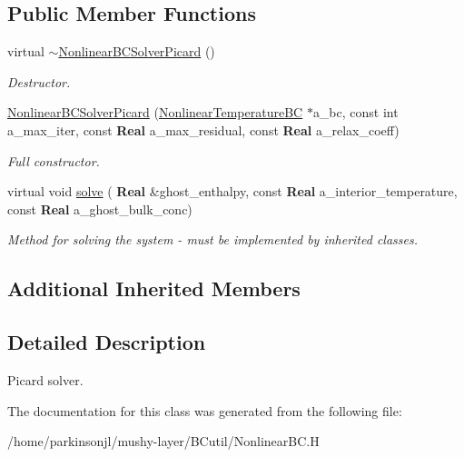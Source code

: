 \subsection*{Public Member Functions}
\begin{DoxyCompactItemize}
\item 
\mbox{\label{class_nonlinear_b_c_solver_picard_aadd7fd7236e3bd17e9ecbe98732fbaef}} 
virtual \hyperlink{class_nonlinear_b_c_solver_picard_aadd7fd7236e3bd17e9ecbe98732fbaef}{$\sim$\+Nonlinear\+B\+C\+Solver\+Picard} ()
\begin{DoxyCompactList}\small\item\em Destructor. \end{DoxyCompactList}\item 
\mbox{\label{class_nonlinear_b_c_solver_picard_a637dbc8d01d0325d8faf047ad6730ed8}} 
\hyperlink{class_nonlinear_b_c_solver_picard_a637dbc8d01d0325d8faf047ad6730ed8}{Nonlinear\+B\+C\+Solver\+Picard} (\hyperlink{class_nonlinear_temperature_b_c}{Nonlinear\+Temperature\+BC} $\ast$a\+\_\+bc, const int a\+\_\+max\+\_\+iter, const \textbf{ Real} a\+\_\+max\+\_\+residual, const \textbf{ Real} a\+\_\+relax\+\_\+coeff)
\begin{DoxyCompactList}\small\item\em Full constructor. \end{DoxyCompactList}\item 
\mbox{\label{class_nonlinear_b_c_solver_picard_aae46d9aa4e8770ba02b10111ecca6a6f}} 
virtual void \hyperlink{class_nonlinear_b_c_solver_picard_aae46d9aa4e8770ba02b10111ecca6a6f}{solve} (\textbf{ Real} \&ghost\+\_\+enthalpy, const \textbf{ Real} a\+\_\+interior\+\_\+temperature, const \textbf{ Real} a\+\_\+ghost\+\_\+bulk\+\_\+conc)
\begin{DoxyCompactList}\small\item\em Method for solving the system -\/ must be implemented by inherited classes. \end{DoxyCompactList}\end{DoxyCompactItemize}
\subsection*{Additional Inherited Members}


\subsection{Detailed Description}
Picard solver. 

The documentation for this class was generated from the following file\+:\begin{DoxyCompactItemize}
\item 
/home/parkinsonjl/mushy-\/layer/\+B\+Cutil/Nonlinear\+B\+C.\+H\end{DoxyCompactItemize}
